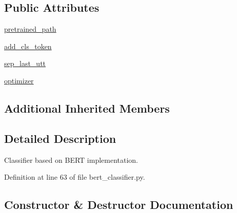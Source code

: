 \subsection*{Public Attributes}
\begin{DoxyCompactItemize}
\item 
\hyperlink{classparlai_1_1agents_1_1bert__classifier_1_1bert__classifier_1_1BertClassifierAgent_a27d04268a995c5f8aad0061dff4b2b13}{pretrained\+\_\+path}
\item 
\hyperlink{classparlai_1_1agents_1_1bert__classifier_1_1bert__classifier_1_1BertClassifierAgent_a23a9fab5a21c9ee44ab416476b7f0361}{add\+\_\+cls\+\_\+token}
\item 
\hyperlink{classparlai_1_1agents_1_1bert__classifier_1_1bert__classifier_1_1BertClassifierAgent_a4cfb560c49609df56c6867623cfb06d2}{sep\+\_\+last\+\_\+utt}
\item 
\hyperlink{classparlai_1_1agents_1_1bert__classifier_1_1bert__classifier_1_1BertClassifierAgent_a5cd45872525e6bd69c29f1cadfa675ed}{optimizer}
\end{DoxyCompactItemize}
\subsection*{Additional Inherited Members}


\subsection{Detailed Description}
\begin{DoxyVerb}Classifier based on BERT implementation.
\end{DoxyVerb}
 

Definition at line 63 of file bert\+\_\+classifier.\+py.



\subsection{Constructor \& Destructor Documentation}
\mbox{\label{classparlai_1_1agents_1_1bert__classifier_1_1bert__classifier_1_1BertClassifierAgent_ac05f1d52c400de5b60284121b4a49746}} 
